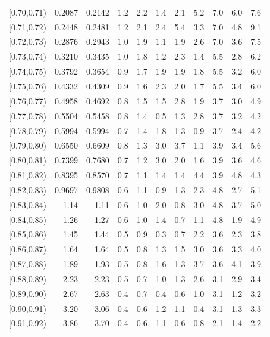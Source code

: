\begin{table}[t!]
{\begin{tabular}{c  r r r r  r r r r  r r}
{[0.70,0.71)} & 0.2087 & 0.2142 & 1.2 & 2.2 & 1.4 & 2.1 & 5.2 & 7.0 & 6.0 & 7.6 \\
{[0.71,0.72)} & 0.2448 & 0.2481 & 1.2 & 2.1 & 2.4 & 5.4 & 3.3 & 7.0 & 4.8 & 9.1 \\
{[0.72,0.73)} & 0.2876 & 0.2943 & 1.0 & 1.9 & 1.1 & 1.9 & 2.6 & 7.0 & 3.6 & 7.5 \\
{[0.73,0.74)} & 0.3210 & 0.3435 & 1.0 & 1.8 & 1.2 & 2.3 & 1.4 & 5.5 & 2.8 & 6.2 \\
{[0.74,0.75)} & 0.3792 & 0.3654 & 0.9 & 1.7 & 1.9 & 1.9 & 1.8 & 5.5 & 3.2 & 6.0 \\
{[0.75,0.76)} & 0.4332 & 0.4309 & 0.9 & 1.6 & 2.3 & 2.0 & 1.7 & 5.5 & 3.4 & 6.0 \\
{[0.76,0.77)} & 0.4958 & 0.4692 & 0.8 & 1.5 & 1.5 & 2.8 & 1.9 & 3.7 & 3.0 & 4.9 \\
{[0.77,0.78)} & 0.5504 & 0.5458 & 0.8 & 1.4 & 0.5 & 1.3 & 2.8 & 3.7 & 3.2 & 4.2 \\
{[0.78,0.79)} & 0.5994 & 0.5994 & 0.7 & 1.4 & 1.8 & 1.3 & 0.9 & 3.7 & 2.4 & 4.2 \\
{[0.79,0.80)} & 0.6550 & 0.6609 & 0.8 & 1.3 & 3.0 & 3.7 & 1.1 & 3.9 & 3.4 & 5.6 \\
{[0.80,0.81)} & 0.7399 & 0.7680 & 0.7 & 1.2 & 3.0 & 2.0 & 1.6 & 3.9 & 3.6 & 4.6 \\
{[0.81,0.82)} & 0.8395 & 0.8570 & 0.7 & 1.1 & 1.4 & 1.4 & 4.4 & 3.9 & 4.8 & 4.3 \\
{[0.82,0.83)} & 0.9697 & 0.9808 & 0.6 & 1.1 & 0.9 & 1.3 & 2.3 & 4.8 & 2.7 & 5.1 \\
{[0.83,0.84)} & 1.14 & 1.11 & 0.6 & 1.0 & 2.0 & 0.8 & 3.0 & 4.8 & 3.7 & 5.0 \\
{[0.84,0.85)} & 1.26 & 1.27 & 0.6 & 1.0 & 1.4 & 0.7 & 1.1 & 4.8 & 1.9 & 4.9 \\
{[0.85,0.86)} & 1.45 & 1.44 & 0.5 & 0.9 & 0.3 & 0.7 & 2.2 & 3.6 & 2.3 & 3.8 \\
{[0.86,0.87)} & 1.64 & 1.64 & 0.5 & 0.8 & 1.3 & 1.5 & 3.0 & 3.6 & 3.3 & 4.0 \\
{[0.87,0.88)} & 1.89 & 1.93 & 0.5 & 0.8 & 1.6 & 1.3 & 3.7 & 3.6 & 4.1 & 3.9 \\
{[0.88,0.89)} & 2.23 & 2.23 & 0.5 & 0.7 & 1.0 & 1.3 & 2.6 & 3.1 & 2.9 & 3.4 \\
{[0.89,0.90)} & 2.67 & 2.63 & 0.4 & 0.7 & 0.4 & 0.6 & 1.0 & 3.1 & 1.2 & 3.2 \\
{[0.90,0.91)} & 3.20 & 3.06 & 0.4 & 0.6 & 1.2 & 1.1 & 0.4 & 3.1 & 1.3 & 3.3 \\
{[0.91,0.92)} & 3.86 & 3.70 & 0.4 & 0.6 & 1.1 & 0.6 & 0.8 & 2.1 & 1.4 & 2.2 \\

\end{tabular}}
\end{table}

